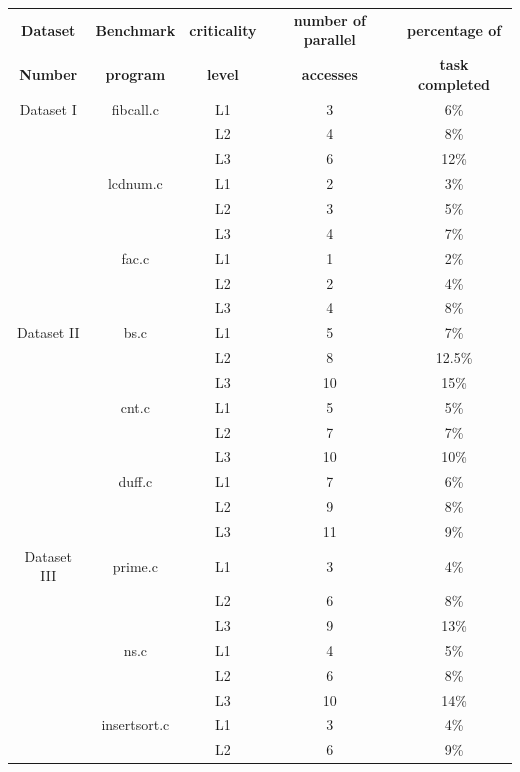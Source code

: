 \begin{table}
{\centering
 \begin{tabular}{|c|c|c|c|c|}\hline
  {\bf Dataset}  & {\bf Benchmark} & {\bf criticality} & {\bf number of parallel} & {\bf percentage of}\\ 
  {\bf Number}  &  {\bf program}   &  {\bf level}      & {\bf accesses}  & {\bf task completed}  \\ \hline
  Dataset I & fibcall.c & L1 & 3 & 6\% \\
            &           & L2 & 4 & 8\%       \\
            &            & L3 & 6 & 12\%           \\
            & lcdnum.c & L1 & 2 & 3\%    \\
            &          & L2 & 3 & 5\%     \\
            &          & L3 & 4 & 7\%          \\
            & fac.c & L1   &  1  & 2\%   \\
            &       & L2   &  2  & 4\%    \\
            &       & L3   & 4   & 8\%   \\ \hline 
 Dataset II & bs.c & L1  & 5  & 7\% \\
            &      & L2  & 8  & 12.5\% \\
            &      & L3 & 10 & 15\% \\
            & cnt.c & L1 & 5 & 5\%\\
            &       & L2 & 7 & 7\%     \\
            &       & L3 & 10 & 10\%    \\
            & duff.c & L1 & 7 & 6\% \\
            &        & L2 & 9 & 8\% \\
            &        & L3 & 11 & 9\% \\ \hline
 Dataset III & prime.c & L1 & 3 & 4\% \\
             &         & L2 & 6 & 8\% \\
             &         & L3 & 9 & 13\% \\
             & ns.c & L1 & 4 & 5\% \\
             &      & L2 & 6 & 8\% \\ 
             &      & L3 & 10 & 14\% \\
             & insertsort.c & L1 & 3 & 4\% \\
             &              & L2 & 6 & 9\% \\

\end{tabular}}
\end{table}
